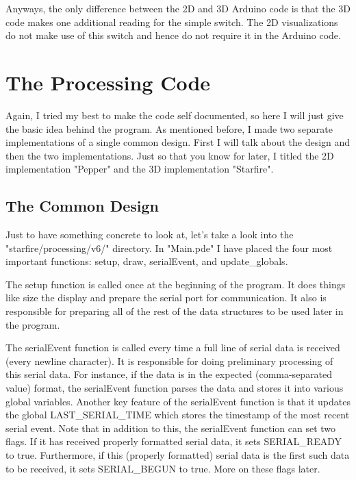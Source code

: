 \documentclass[paper=a4, fontsize=12pt]{scrartcl} 	%
\newcommand{\mm}[1]{\fontfamily{\ttdefault}\selectfont#1\fontfamily{\rmdefault}\selectfont}
\begin{document}
	Anyways, the only difference between the 2D and 3D Arduino code is that the 3D code makes one additional reading for the simple switch.  The 2D visualizations do not make use of this switch and hence do not require it in the Arduino code.



\section{The Processing Code}
	Again, I tried my best to make the code self documented, so here I will just give the basic idea behind the program.  As mentioned before, I made two separate implementations of a single common design.  First I will talk about the design and then the two implementations.  Just so that you know for later, I titled the 2D implementation "Pepper" and the 3D implementation "Starfire".
	
\subsection{The Common Design}
	Just to have something concrete to look at, let's take a look into the "starfire/processing/v6/" directory.  In "Main.pde" I have placed the four most important functions: \mm{setup}, \mm{draw}, \mm{serialEvent}, and \mm{update\_globals}. 
	 
	The \mm{setup} function is called once at the beginning of the program.  It does things like size the display and prepare the serial port for communication.  It also is responsible for preparing all of the rest of the data structures to be used later in the program.
	
	The \mm{serialEvent} function is called every time a full line of serial data is received (every newline character).  It is responsible for doing preliminary processing of this serial data.  For instance, if the data is in the expected (comma-separated value) format, the \mm{serialEvent} function parses the data and stores it into various global variables.  Another key feature of the \mm{serialEvent} function is that it updates the global \mm{LAST\_SERIAL\_TIME} which stores the timestamp of the most recent serial event.  Note that in addition to this, the \mm{serialEvent} function can set two flags.  If it has received properly formatted serial data, it sets \mm{SERIAL\_READY} to true.  Furthermore, if this (properly formatted) serial data is the first such data to be received, it sets \mm{SERIAL\_BEGUN} to true.  More on these flags later.
	
\end{document}

